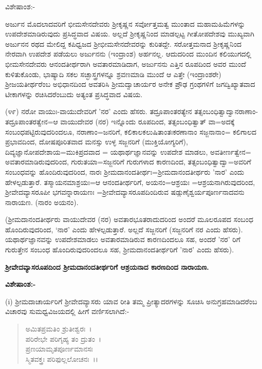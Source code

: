 \noindent
ವಿಶೇಷಾಂಶ:-

ಅರ್ಜುನ ಮೊದಲಾದವರಿಗೆ ಭೀಮಸೇನದೇವರು ಶ‍್ರೀಕೃಷ್ಣನ ಸರ್ವೋತ್ತಮತ್ವ ಮುಂತಾದ ಮಹಾಮಹಿಮೆಗಳನ್ನು ಉಪದೇಶಮಾಡಿರುವುದು ಪ್ರಸಿದ್ಧವಾದ ವಿಷಯ. ಅಲ್ಲದೆ ಶ‍್ರೀಕೃಷ್ಣನಿಂದ ಮಾಡಲ್ಪಟ್ಟ ಗೀತೋಪದೇಶವು ಮುಖ್ಯವಾಗಿ ಅರ್ಜುನನ ರಥದ ಮೇಲಿದ್ದ ಕಪಿಧ್ವಜದ ಶ‍್ರೀಭೀಮಸೇನದೇವರನ್ನು ಕುರಿತದ್ದೇ. ಸರೋತ್ತಮನಾದ ಶ‍್ರೀಕೃಷ್ಣನಿಂದ ನೇರವಾಗಿ ಉಪದೇಶ ಪಡೆಯಲು ಅರ್ಜುನನು (ಇಂದ್ರಾಂಶ) ಅರ್ಹನಲ್ಲ. ಆದುದರಿಂದ ಮುಂದಿನ ಕಲಿಯುಗದಲ್ಲಿ ಭೀಮಸೇನದೇವರು ಆನಂದತೀರ್ಥರಾಗಿ ಅವತಾರಮಾಡಿದಾಗ, ಅರ್ಜುನನು ಎತ್ತಿನ ರೂಪದಿಂದ ಅವರ ಮುಂದೆ ಕುಳಿತುಕೊಂಡು, ಭಾಷ್ಯಾದಿ ಸಕಲ ಸಚ್ಛಾಸ್ತ್ರಗಳನ್ನೂ ಶ್ರವಣಮಾಡಿ ಮುಂದೆ ಆ ಎತ್ತೇ (ಇಂದ್ರಾಂಶರೇ) ಶ‍್ರೀಜಯತೀರ್ಥರೆಂಬ ಅಭಿಧಾನದಿಂದ ಅವತರಿಸಿ ಶ‍್ರೀಮದ್ವಾಚಾರ್ಯರ ಅನೇಕ ಪ್ರೌಢ ಗ್ರಂಥಗಳಿಗೆ ಜಗದ್ವಿಖ್ಯಾತವಾದ ಟೀಕಾಗಳನ್ನು ರಚಿಸಿದರೆಂಬುದು ಅತ್ಯಂತ ಪ್ರಸಿದ್ಧವಾದ ವಿಷಯ.

(೪೯) ನರೋ ವಾಯುಃ-ವಾಯುದೇವರಿಗೆ 'ನರ' ಎಂದು ಹೆಸರು. ತದ್ರೂಪಾಂತರತ್ಯೇನ ತತ್ಸಂಬಂಧಿತ್ವಾದ್ವಾನರಾಣಾಂ-ತದ್ರೂಪಾಂತರತ್ವೇನ=ಆ ವಾಯುದೇವರ (ನರ) ಇನ್ನೊಂದು ರೂಪದಿಂದ, ತತ್ಸಂಬಂಧಿತ್ವಾತ್ ವಾ=ಅದಕ್ಕೆ ಸಂಬಂಧಪಟ್ಟಿರುವುದರಿಂದಲೂ, ನರಾಣಾಂ=ಜನರಿಗೆ, ಕಲಿಕಾಲಕಲುಷಿತಾಂತಃಕರಣಾನಾಂ ಸಜ್ಜನಾನಾಂ= ಕಲಿಗಾಲದ ಪ್ರಭಾವದಿಂದ, ದೋಷಪೂರಿತವಾದ ಮನಸ್ಸು ಉಳ್ಳ ಸಜ್ಜನರಿಗೆ (ಮುಕ್ತಿಯೋಗ್ಯರಿಗೆ), ದಿವ್ಯಜ್ಞಾನೋಪದೇಶಾಯ=ಮುಕಿಪ್ರದವಾದ = ಯಥಾರ್ಥಜ್ಞಾನವನ್ನು ಉಪದೇಶ ಮಾಡಲು, ಅವತೀರ್ಣತ್ವೇನ= ಅವತಾರಮಾಡಿರುವುದರಿಂದ, ಗುರುತಯಾ=ಸಜ್ಜನರಿಗೆ ಗುರುಗಳಾದ ಕಾರಣದಿಂದ, ತತ್ಸಂಬಂಧಿತ್ವಾದ್ವಾ=ಅವರಿಗೆ ಸಂಬಂಧವನ್ನು ಹೊಂದಿರುವುದರಿಂದ, ನಾರಃ ಶ‍್ರೀಮದಾನಂದತೀರ್ಥಃ=ಶ‍್ರೀಮದಾನಂದತೀರ್ಥರು 'ನಾರ' ಎಂದು ಹೇಳಲ್ಪಡುತ್ತಾರೆ. ತಸ್ಮಾಯನಮಾಶ್ರಯಃ=ಆ ಆನಂದತೀರ್ಥರಿಗೆ, ಅಯನಂ=ಆಶ್ರಯಃ =ಆಶ್ರಯನಾಗಿರುವುದರಿಂದ, ಶ‍್ರೀವೇದವ್ಯಾಸರೂಪೀ ಭಗವನ್ನಾರಾಯಣಃ =ಶ‍್ರೀವೇದವ್ಯಾಸರೂಪದಿಂದಿರುವ ಷಡ್ಗುಣೈಶ್ವರ್ಯಪೂರ್ಣನಾದವನು ನಾರಾಯಣ. (ನಾರಂ ಅಯನಂ).

(ಶ‍್ರೀಮದಾನಂದತೀರ್ಥರು ವಾಯುದೇವರ (ನರ) ಅವತಾರಭೂತರಾದುದರಿಂದ ಅಂದರೆ ಮೂಲರೂಪದ ಸಂಬಂಧ ಹೊಂದಿರುವುದರಿಂದ, `ನಾರ' ಎಂದು ಹೇಳಲ್ಪಡುತ್ತಾರೆ. ಅಲ್ಲದೆ ಸಜ್ಜನರಿಗೆ (ಸಜ್ಜನರಿಗೆ ನರ ಎಂದು ಹೆಸರು). ಯಥಾರ್ಥಜ್ಞಾನವನ್ನು ಉಪದೇಶಮಾಡಲು ಅವತಾರಮಾಡಿರುವ ಕಾರಣದಿಂದಲೂ ಸಹ, ಅಂದರೆ 'ನರ' ರಿಗೆ ಗುರುತ್ತೇನ ಸಂಬಂಧ ಹೊಂದಿರುವುದರಿಂದಲೂ ಸಹ, ಶ‍್ರೀಮದಾನಂದತೀರ್ಥರಿಗೆ 'ನಾರ' ಎಂದು ಹೆಸರು).

\begin{center}
\textbf{ಶ‍್ರೀವೇದವ್ಯಾಸರೂಪದಿಂದ ಶ‍್ರೀಮದಾನಂದತೀರ್ಥರಿಗೆ ಆಶ್ರಯನಾದ ಕಾರಣದಿಂದ ನಾರಾಯಣ.}
\end{center}

\noindent
\textbf{ವಿಶೇಷಾಂಶ:-}

(i) ಶ‍್ರೀಮದಾಚಾರ್ಯರಿಗೆ ಶ‍್ರೀವೇದವ್ಯಾಸರು ಯಾವ ರೀತಿ ತಮ್ಮ ಪ್ರೀತ್ಯಾದರಗಳನ್ನು ಸೂಚಿಸಿ ಅನುಗ್ರಹಮಾಡಿದರೆಂಬ ವಿಚಾರವು ಸುಮಧ್ವವಿಜಯದಲ್ಲಿ ಹೀಗೆ ವರ್ಣಿಸಲಾಗಿದೆ:-

\begin{verse}
ಅಮಿತಪ್ರಮತಿಂ ಶ್ರುತೀಶ್ವರಃ~।\\ ಪರಿರೇಭೇ ಪರಿಗೃಹ್ಯ ತಂ ದ್ರುತಂ~।\\ ಪ್ರಣಯಾಮೃತಪೂರ್ಣಮಾನಸಃ\\ ಸ್ಮಿತವಕ್ತ್ರಃ ಪರಿಫುಲ್ಲಲೋಚನಃ~।।
\end{verse}

